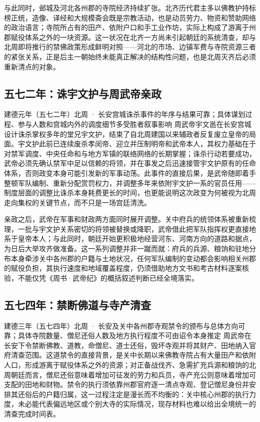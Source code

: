 与此同时，邺城及河北各州郡的寺院经济持续扩张。北齐历代君主多以佛教护持标榜正统，造像、译经和大规模斋会既是宗教活动，也是动员劳力、物资和赞助网络的政治语言；寺院所占有的田产、依附户口和手工业作坊，实际上构成了游离于州郡赋役体系之外的一块资源。这一状况在北齐一方尚未引起朝廷的系统清查，却与北周即将推行的禁佛政策形成鲜明对照——河北的市场、边镇军费与寺院资源三者的紧张关系，正是后主一朝始终未能真正解决的结构性问题，也是北周灭齐后必须重新清点的对象。

\subsection{五七二年：诛宇文护与周武帝亲政}

\begin{event}{}{建德元年（五七二年）}{北周 · 长安宫城}{诛杀事件的年序与结果可靠；具体谋划过程、参与人数和宫城内外的调度细节多受胜者叙事影响}
周武帝宇文邕在长安宫城设计诛杀掌权多年的堂兄宇文护，结束了自北周建国以来辅政者反复废立皇帝的局面。宇文护此前已连续废杀孝闵帝、迎立并压制明帝和武帝本人，其权力基础在于对禁军调度、中央任命和与地方军镇的联络网络的长期掌握；诛杀行动若要成功，武帝必须先确认禁军中足以信赖的将领，并在事发之后迅速接管宇文护原有的任命体系，否则政变本身可能引发新的军事动荡。此事件的直接后果，是武帝随即着手整顿军队编制、重新分配赏罚权力，并调整多年来依附宇文护一系的官员任用——制度层面的调整比诛杀本身耗费更长的时间，也更能说明这次政变为何被视为北周走向集权的关键节点，而不只是一场宫廷清洗。
\end{event}

亲政之后，武帝在军事和财政两方面同时展开调整。关中府兵的统领体系被重新梳理，一批与宇文护关系密切的将领被替换或降职，武帝借此把军队指挥权更直接地系于皇帝本人；与此同时，朝廷开始更积极地经营河东、河南方向的道路和据点，为日后大举攻齐做准备。这一系列调整并非一蹴而就：府兵的兵源、粮饷和驻地分布本身牵涉关中各州郡的户籍与土地状况，任何军队编制的变动都会影响相关州郡的赋役负担，其执行速度和地域覆盖程度，仍须借助地方文书和考古材料逐案核验，不能仅凭《周书·武帝纪》的概括叙述判断已经全境落实。

\subsection{五七四年：禁断佛道与寺产清查}

\begin{event}{}{建德三年（五七四年）}{北周 · 长安及关中各州郡寺观}{禁令的颁布与总体方向可靠；具体寺院数量、僧尼还俗人数及地方执行程度不可由诏令本身推定}
周武帝在长安下令禁断佛教、道教，命僧尼、道士还俗，毁坏寺观并将其财产、田地纳入官府清查范围。这道禁令的直接背景，是关中长期以来佛教寺院占有大量田产和依附人口，形成游离于赋役体系之外的资源；对正备战伐齐、急需扩充兵源和粮饷的北周朝廷而言，僧尼还俗意味着增加可征发的劳力和兵员，寺产充公则意味着增加可支配的田地和财物。禁令的执行须依靠州郡官府逐一清点寺观、登记僧尼身份并安排其还俗后的户籍归属，这一过程注定是漫长而不均衡的：关中核心州郡的执行力度，未必能代表偏远地区或个别大寺的实际情况，现存材料也难以给出全境统一的清查完成时间表。
\end{event}

